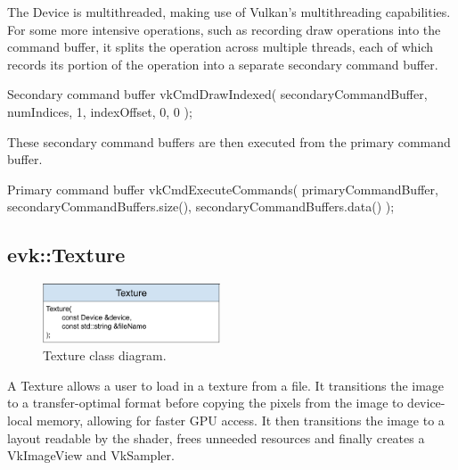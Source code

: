 \documentclass[12pt]{report}
\newcommand{\imagewidth}{0.47\textwidth}
\theoremstyle{definition}
\begin{document}
        The Device is multithreaded, making use of Vulkan's multithreading
        capabilities. For some more intensive operations, such as recording
        draw operations into the command buffer, it splits the operation
        across multiple threads, each of which records its portion of the
        operation into a separate secondary command buffer.

        \begin{usage}{Secondary command buffer}
  vkCmdDrawIndexed(
    secondaryCommandBuffer, numIndices,
    1, indexOffset, 0, 0
  );
        \end{usage}

        These secondary command buffers are then executed from the primary
        command buffer.

        \begin{usage}{Primary command buffer}
  vkCmdExecuteCommands(
    primaryCommandBuffer,
    secondaryCommandBuffers.size(),
    secondaryCommandBuffers.data()
  );
        \end{usage}

      \subsection{evk::Texture}

        \begin{figure}[h]
          \centering
          \includegraphics[width=\imagewidth]{images/class_texture.png}
          \caption{Texture class diagram.}
          \label{fig:class_texture}  
        \end{figure}

        A Texture allows a user to load in a texture from a file. It transitions
        the image to a transfer-optimal format before copying the pixels from
        the image to device-local memory, allowing for faster GPU access. It
        then transitions the image to a layout readable by the shader, frees
        unneeded resources and finally creates a VkImageView and VkSampler. \\
\end{document}

